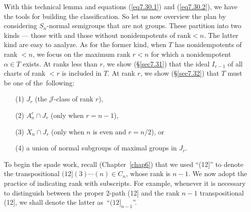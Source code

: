 \documentclass{surv-l}
\numberwithin{equation}{section}
\numberwithin{table}{section}
\numberwithin{figure}{section}
\theoremstyle{definition}
\begin{document}
With this technical lemma and equations (\ref{eq7.30.1}) and
(\ref{eq7.30.2}), we have the tools for building the
classification. So let us now overview the plan by considering
$S_{n}$-normal semigroups that are not groups. These partition
into two kinds --- those with and those without nonidempotents of
$\mathrm{rank}<n$. The latter kind are easy to analyze. As for the former
kind, when $T$ has nonidempotents of rank $<n$, we focus on the
maximum rank $r<n$ for which a nonidempotent $\alpha\in T$ exists.
At ranks less than $r$, we show (\S\ref{sec7.31}) that the ideal
$I_{r-1}$ of all charts of rank $<r$ is included in $T$. At rank
$r$, we show (\S\ref{sec7.32}) that $T$ must be one of
the~following:
\begin{enumerate}
\item[(1)] $J_{r}$ (the $\mathcal{J}$-class of rank $r$),

\item[(2)] $A_{n}^{c}\cap J_{r}$ (only when $r=n -1$),

\item[(3)] $X_{n}\cap J_{r}$ (only when $n$ is even and $r=n/2$), or

\item[(4)] a union of normal subgroups of maximal groups in $J_{r}$.
\end{enumerate}

To begin the spade work, recall (Chapter~\ref{chap6}) that we used
``(12]'' to denote the transpositional $(12](3)\cdots(n) \in
C_{n}$, whose rank is $n-1$. We now adopt the practice of
indicating rank with subscripts. For example, whenever it is
necessary to distinguish between the proper 2-path (12] and the
rank $n-1$ transpositional (12], we shall denote the latter
as~``$(12]_{n-1}$''.
\end{document}
